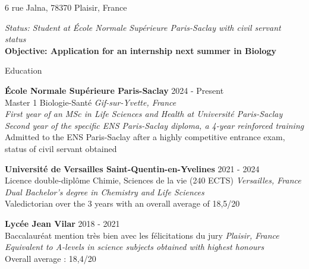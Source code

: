 \documentclass[
	10pt,
]{style} %
\begin{document}
\vspace{-0.25em}

\begin{center}
	6 rue Jalna, 78370 Plaisir, France \\
\end{center}

\begin{center}
	\textit{Status: Student at École Normale Supérieure Paris-Saclay with civil servant status} \\
	\textbf{Objective: Application for an internship next summer in Biology}
\end{center}


\begin{rSection}{Education}

	\textbf{École Normale Supérieure Paris-Saclay} \hfill 2024 - Present \\
	Master 1 Biologie-Santé \hfill \textit{Gif-sur-Yvette, France} \\
	\textit{First year of an MSc in Life Sciences and Health at Université Paris-Saclay} \\
	\textit{Second year of the specific ENS Paris-Saclay diploma, a 4-year reinforced training} \\
	Admitted to the ENS Paris-Saclay after a highly competitive entrance exam, status of civil servant obtained

	\vspace{0.5mm}

	\textbf{Université de Versailles Saint-Quentin-en-Yvelines} \hfill 2021 - 2024 \\
	Licence double-diplôme Chimie, Sciences de la vie (240 ECTS) \hfill \textit{Versailles, France} \\
	\textit{Dual Bachelor's degree in Chemistry and Life Sciences} \\
	Valedictorian over the 3 years with an overall average of 18,5/20

	\vspace{0.5mm}

	\textbf{Lycée Jean Vilar} \hfill 2018 - 2021 \\
	Baccalauréat mention très bien avec les félicitations du jury \hfill \textit{Plaisir, France} \\
	\textit{Equivalent to A-levels in science subjects obtained with highest honours} \\
	Overall average : 18,4/20
\end{rSection}
\end{document}
